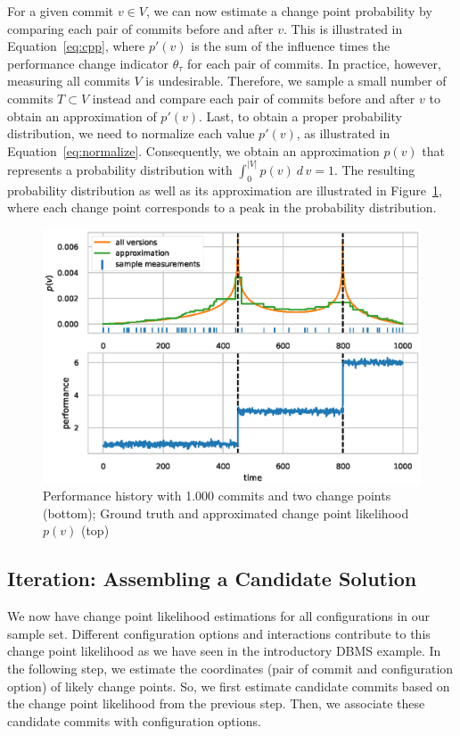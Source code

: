 \documentclass[sigconf]{acmart}
\begin{document}
	For a given commit $v\in V$, we can now estimate a change point probability by comparing each pair of commits before and after $v$.
	This is illustrated in Equation~\ref{eq:cpp}, where $p'(v)$ is the sum of the influence times the performance change indicator $\theta_\tau$ for each pair of commits.
	In practice, however, measuring all commits $V$ is undesirable.
	Therefore, we sample a small number of commits $T \subset V$ instead and compare each pair of commits before and after $v$ to obtain an approximation of $p'(v)$.
	Last, to obtain a proper probability distribution, we need to normalize each value $p'(v)$, as illustrated in Equation~\ref{eq:normalize}.
	Consequently, we obtain an approximation $p(v)$ that represents a probability distribution with $\int_0^{\vert V\vert} p(v)\ d\,v = 1$. The resulting probability distribution as well as its approximation are illustrated in Figure~\ref{fig:cpp_example}, where each change point corresponds to a peak in the probability distribution.
	
	\begin{figure}
		\centering
		\includegraphics[width=\linewidth]{images/cpp_example.eps}
		\caption{Performance history with 1.000 commits and two change points (bottom); Ground truth and approximated change point likelihood $p(v)$ (top)}
		\label{fig:cpp_example}
	\end{figure}
	
	\subsection{Iteration: Assembling a Candidate Solution}\label{sec:candidatesolution}
	We now have change point likelihood estimations for all configurations in our sample set. 
	Different configuration options and interactions contribute to this change point likelihood as we have seen in the introductory DBMS example. 
	In the following step, we estimate the coordinates (pair of commit and configuration option) of likely change points. 
	So, we first estimate candidate commits based on the change point likelihood from the previous step. 
	Then, we associate these candidate commits with configuration options.
	
\end{document}
